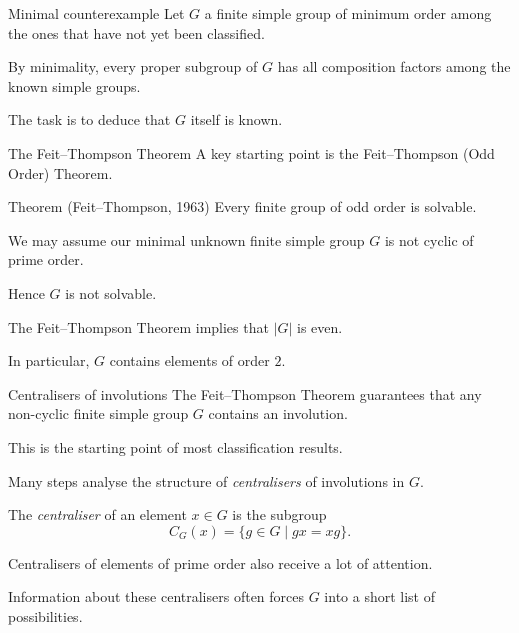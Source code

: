 \documentclass{beamer}
\begin{document}
\begin{frame}{Minimal counterexample}
Let $G$ a finite simple group of minimum order among the ones that have not yet been classified.

\bigskip

By minimality, every proper subgroup of $G$ has all composition factors among the known simple groups.

\bigskip

The task is to deduce that $G$ itself is known.

\end{frame}

\begin{frame}{The Feit--Thompson Theorem}
A key starting point is the Feit--Thompson (Odd Order) Theorem.

\begin{block}{Theorem (Feit--Thompson, 1963)}
Every finite group of odd order is solvable.
\end{block}

\bigskip

We may assume our minimal unknown finite simple group $G$ is not cyclic of prime order.

\bigskip

Hence $G$ is not solvable.

\bigskip

The Feit--Thompson Theorem implies that $|G|$ is even.

\bigskip

In particular, $G$ contains elements of order $2$.
\end{frame}

\begin{frame}{Centralisers of involutions}
The Feit--Thompson Theorem guarantees that any non-cyclic finite simple group $G$ contains an involution.

\bigskip

This is the starting point of most classification results.

\bigskip

Many steps analyse the structure of \emph{centralisers} of involutions in $G$.

\bigskip

The \emph{centraliser} of an element $x \in G$ is the subgroup
\[
C_G(x)=\{g\in G \mid gx=xg\}.
\]

\bigskip

Centralisers of elements of prime order also receive a lot of attention.

\bigskip

Information about these centralisers often forces $G$ into a short list of possibilities.

\end{frame}
\end{document}
